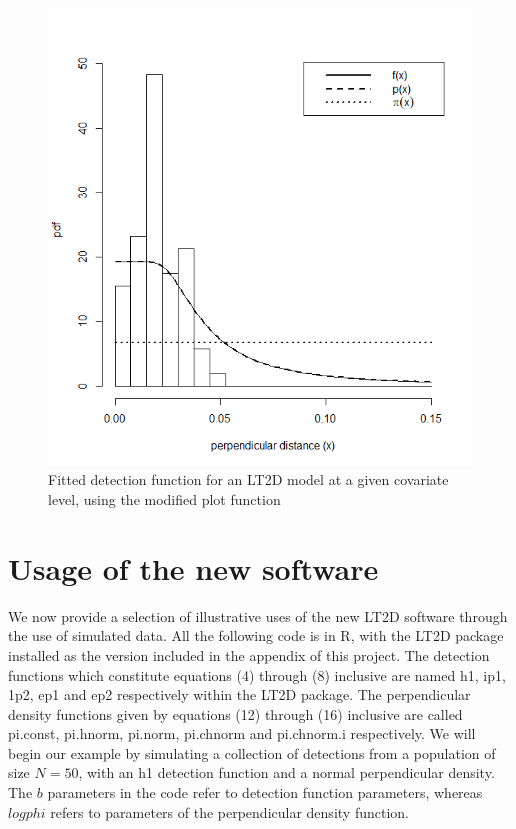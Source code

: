 \documentclass[11pt]{article}
\begin{document}
\begin{multicols}{2}
\begin{figure}[H]
\center
\includegraphics[scale=0.57]{covarplot2}
\caption{Fitted detection function for an LT2D model at a given covariate level, using the modified plot function}
\end{figure}

\section{Usage of the new software}
We now provide a selection of illustrative uses of the new LT2D software through the use of simulated data. All the following code is in R, with the LT2D package installed as the version included in the appendix of this project. The detection functions which constitute equations (4) through (8) inclusive are named h1, ip1, 1p2, ep1 and ep2 respectively within the LT2D package. The perpendicular density functions given by equations (12) through (16) inclusive are called pi.const, pi.hnorm, pi.norm, pi.chnorm and pi.chnorm.i respectively. We will begin our example by simulating a collection of detections from a population of size $N=50$, with an h1 detection function and a normal perpendicular density. The $b$ parameters in the code refer to detection function parameters, whereas $logphi$ refers to parameters of the perpendicular density function.


\end{multicols}
\end{document}
